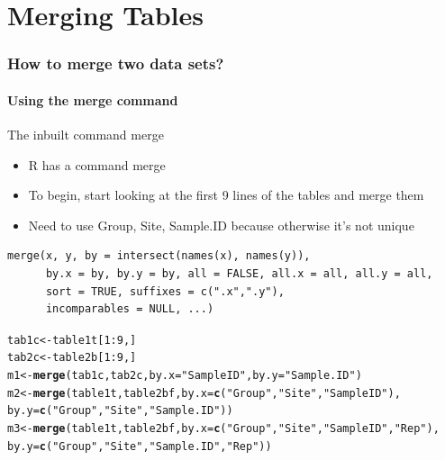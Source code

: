 \documentclass[12pt]{beamer}\usepackage[]{graphicx}\usepackage[]{color}
\makeatletter
\newcommand{\hlnum}[1]{\textcolor[rgb]{0.686,0.059,0.569}{#1}}%
\newcommand{\hlstr}[1]{\textcolor[rgb]{0.192,0.494,0.8}{#1}}%
\newcommand{\hlopt}[1]{\textcolor[rgb]{0,0,0}{#1}}%
\newcommand{\hlstd}[1]{\textcolor[rgb]{0.345,0.345,0.345}{#1}}%
\newcommand{\hlkwb}[1]{\textcolor[rgb]{0.69,0.353,0.396}{#1}}%
\newcommand{\hlkwc}[1]{\textcolor[rgb]{0.333,0.667,0.333}{#1}}%
\newcommand{\hlkwd}[1]{\textcolor[rgb]{0.737,0.353,0.396}{\textbf{#1}}}%
\newenvironment{kframe}{%
 \def\at@end@of@kframe{}%
 \ifinner\ifhmode%
  \def\at@end@of@kframe{\end{minipage}}%
  \begin{minipage}{\columnwidth}%
 \fi\fi%
 \def\FrameCommand##1{\hskip\@totalleftmargin \hskip-\fboxsep
 \colorbox{shadecolor}{##1}\hskip-\fboxsep
     \hskip-\linewidth \hskip-\@totalleftmargin \hskip\columnwidth}%
 \MakeFramed {\advance\hsize-\width
   \@totalleftmargin\z@ \linewidth\hsize
   \@setminipage}}%
 {\par\unskip\endMakeFramed%
 \at@end@of@kframe}
\newenvironment{knitrout}{}{} %
\makeatother
\begin{document}
\section*{Merging Tables}
\begin{frame}[fragile]
  \frametitle{How to merge two data sets?}
  \framesubtitle{Using the merge command}

\begin{block}{The inbuilt command merge}
\begin{itemize}
\item R has a command merge
\item To begin, start looking at the first 9 lines of the tables and merge them 
\item Need to use Group, Site, Sample.ID because otherwise it's not unique
\end{itemize}
\end{block}
\begin{lstlisting}
merge(x, y, by = intersect(names(x), names(y)),
      by.x = by, by.y = by, all = FALSE, all.x = all, all.y = all,
      sort = TRUE, suffixes = c(".x",".y"),
      incomparables = NULL, ...)
\end{lstlisting}

\begin{knitrout}
\color{fgcolor}\begin{kframe}
\begin{alltt}
\hlstd{tab1c}\hlkwb{<-}\hlstd{table1t[}\hlnum{1}\hlopt{:}\hlnum{9}\hlstd{,]}
\hlstd{tab2c}\hlkwb{<-}\hlstd{table2b[}\hlnum{1}\hlopt{:}\hlnum{9}\hlstd{,]}
\hlstd{m1}\hlkwb{<-}\hlkwd{merge}\hlstd{(tab1c,tab2c,}\hlkwc{by.x}\hlstd{=}\hlstr{"Sample ID"}\hlstd{,}\hlkwc{by.y}\hlstd{=}\hlstr{"Sample.ID"}\hlstd{)}
\hlstd{m2}\hlkwb{<-}\hlkwd{merge}\hlstd{(table1t,table2bf,}\hlkwc{by.x}\hlstd{=}\hlkwd{c}\hlstd{(}\hlstr{"Group"}\hlstd{,}\hlstr{"Site"}\hlstd{,}\hlstr{"Sample ID"}\hlstd{),}
\hlkwc{by.y}\hlstd{=}\hlkwd{c}\hlstd{(}\hlstr{"Group"}\hlstd{,}\hlstr{"Site"}\hlstd{,}\hlstr{"Sample.ID"}\hlstd{))}
\hlstd{m3}\hlkwb{<-}\hlkwd{merge}\hlstd{(table1t,table2bf,}\hlkwc{by.x}\hlstd{=}\hlkwd{c}\hlstd{(}\hlstr{"Group"}\hlstd{,}\hlstr{"Site"}\hlstd{,}\hlstr{"Sample ID"}\hlstd{,}\hlstr{"Rep"}\hlstd{),}
\hlkwc{by.y}\hlstd{=}\hlkwd{c}\hlstd{(}\hlstr{"Group"}\hlstd{,}\hlstr{"Site"}\hlstd{,}\hlstr{"Sample.ID"}\hlstd{,}\hlstr{"Rep"}\hlstd{))}
\end{alltt}
\end{kframe}
\end{knitrout}
\end{frame}  
\end{document}
